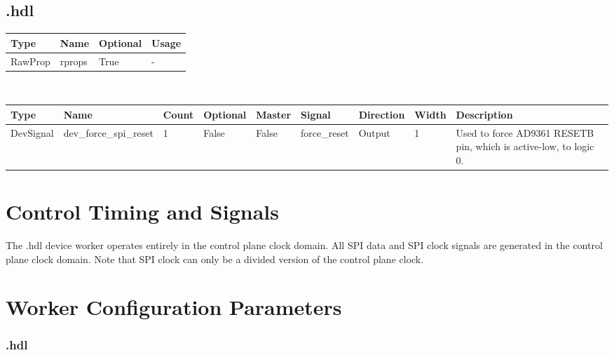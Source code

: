 \begin{landscape}
	\subsection*{\comp.hdl}
	\begin{scriptsize}
		\begin{tabular}{|p{2cm}|p{1.5cm}|p{1.5cm}|p{15.74cm}|}
			\hline
			\rowcolor{blue}
			Type            & Name & Optional & Usage                  \\
			\hline
			RawProp & rprops  & True & - \\
			\hline
		\end{tabular}
	\end{scriptsize} \\
	\begin{scriptsize}
		\begin{tabular}{|p{1.5cm}|p{2.4cm}|p{1.05cm}|p{1.25cm}|p{1.2cm}|p{2cm}|p{1.4cm}|p{0.9cm}|p{6.88cm}|}
			\hline
			\rowcolor{blue}
			Type                       & Name                            & Count & Optional & Master                & Signal                & Direction                  & Width                    & Description                                                                                                                  \\
			\hline
			DevSignal & dev\_force\_spi\_reset & 1 & False & False & force\_reset & Output & 1 & Used to force AD9361 RESETB pin, which is active-low, to logic 0. \\
			\hline
		\end{tabular}
	\end{scriptsize}
\end{landscape}

\section*{Control Timing and Signals}
The \Comp{}.hdl device worker operates entirely in the control plane clock domain. All SPI data and SPI clock signals are generated in the control plane clock domain. Note that SPI clock can only be a divided version of the control plane clock.

\section*{Worker Configuration Parameters}
\subsubsection*{\comp.hdl}
%
